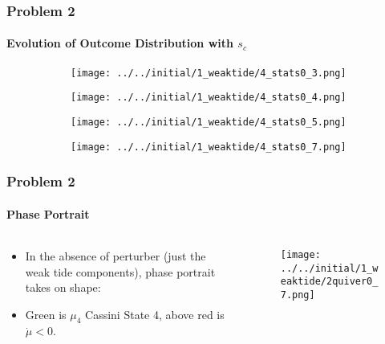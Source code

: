 \documentclass[dvipsnames, 11pt]{beamer}
\begin{document}
\begin{frame}
    \frametitle{Problem 2}
    \framesubtitle{Evolution of Outcome Distribution with $s_c$}

    \begin{figure}[t]
        \centering
        \begin{subfigure}{0.4\textwidth}
            \centering
                \texttt{[image: ../../initial/1\_weaktide/4\_stats0\_3.png]}
        \end{subfigure}
        \begin{subfigure}{0.4\textwidth}
            \centering
                \texttt{[image: ../../initial/1\_weaktide/4\_stats0\_4.png]}
        \end{subfigure}

        \begin{subfigure}{0.4\textwidth}
            \centering
                \texttt{[image: ../../initial/1\_weaktide/4\_stats0\_5.png]}
        \end{subfigure}
        \begin{subfigure}{0.4\textwidth}
            \centering
                \texttt{[image: ../../initial/1\_weaktide/4\_stats0\_7.png]}
        \end{subfigure}
    \end{figure}
\end{frame}

\begin{frame}
    \frametitle{Problem 2}
    \framesubtitle{Phase Portrait}

    \begin{columns}
        \begin{column}{0.5\textwidth}
            \begin{itemize}
                \item In the absence of perturber (just the weak tide
                    components), phase portrait takes on shape:

                \item Green is $\mu_4$ Cassini State 4, above red is $\dot{\mu}
                    < 0$.
            \end{itemize}
        \end{column}
        \begin{column}{0.5\textwidth}
            \begin{figure}[t]
                \centering
                \texttt{[image: ../../initial/1\_weaktide/2quiver0\_7.png]}
            \end{figure}
        \end{column}
    \end{columns}
\end{frame}
\end{document}

